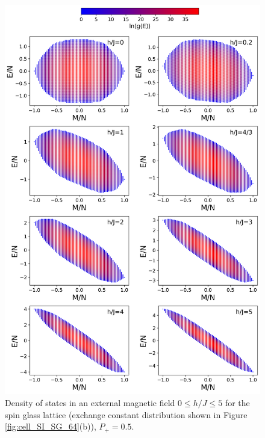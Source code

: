 \documentclass[preprint,12pt]{elsarticle}
\begin{document}
	\begin{figure}[H]
		\centering
		\includegraphics[width=1\linewidth]{pictures/HDOS_SG_64_J0.png}
		\caption{Density of states in an external magnetic field $0\leq h/J \leq 5$ for the spin glass lattice (exchange constant distribution shown in Figure \ref{fig:cell_SI_SG_64}(b)), $P_+ = 0.5$.}
		\label{fig:HDOS_glass}
	\end{figure}
	
\end{document}
